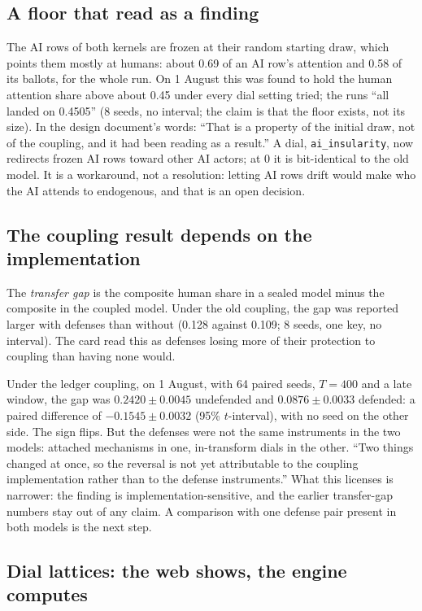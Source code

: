 \documentclass[11pt]{article}
\newcommand{\code}[1]{\texttt{#1}}
\begin{document}
\subsection{A floor that read as a finding}

The AI rows of both kernels are frozen at their random starting draw, which points
them mostly at humans: about 0.69 of an AI row's attention and 0.58 of its ballots, for
the whole run. On 1 August this was found to hold the human attention share above
about 0.45 under every dial setting tried; the runs ``all landed on 0.4505'' (8 seeds,
no interval; the claim is that the floor exists, not its size). In the design
document's words: ``That is a property of the initial draw, not of the coupling, and it
had been reading as a result.'' A dial, \code{ai\_insularity}, now redirects frozen AI
rows toward other AI actors; at 0 it is bit-identical to the old model. It is a
workaround, not a resolution: letting AI rows drift would make who the AI attends to
endogenous, and that is an open decision.

\subsection{The coupling result depends on the implementation}\label{sec:flip}

The \emph{transfer gap} is the composite human share in a sealed model minus the
composite in the coupled model. Under the old coupling, the gap was reported larger
with defenses than without (0.128 against 0.109; 8 seeds, one key, no interval). The
card read this as defenses losing more of their protection to coupling than having
none would.

Under the ledger coupling, on 1 August, with 64 paired seeds, $T=400$ and a late
window, the gap was $0.2420 \pm 0.0045$ undefended and $0.0876 \pm 0.0033$ defended:
a paired difference of $-0.1545 \pm 0.0032$ (95\% $t$-interval), with no seed on the
other side. The sign flips. But the defenses were not the same instruments in the two
models: attached mechanisms in one, in-transform dials in the other. ``Two things
changed at once, so the reversal is not yet attributable to the coupling implementation
rather than to the defense instruments.'' What this licenses is narrower: the finding
is implementation-sensitive, and the earlier transfer-gap numbers stay out of any
claim. A comparison with one defense pair present in both models is the next step.

\subsection{Dial lattices: the web shows, the engine computes}
\end{document}
